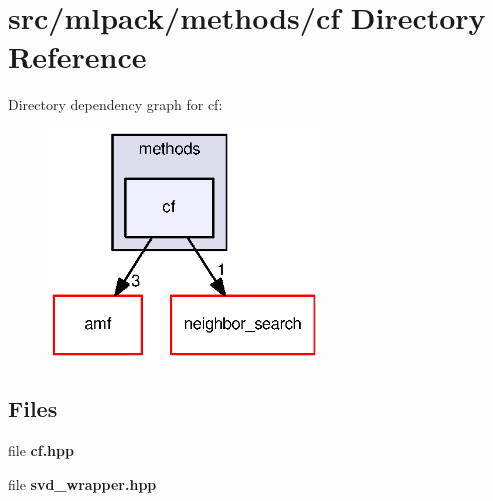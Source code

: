 \section{src/mlpack/methods/cf Directory Reference}
\label{dir_51f04b16a02a56d32fcaa62b5a9b38be}
Directory dependency graph for cf\+:
\nopagebreak
\begin{figure}[H]
\begin{center}
\leavevmode
\includegraphics[width=204pt]{dir_51f04b16a02a56d32fcaa62b5a9b38be_dep}
\end{center}
\end{figure}
\subsection*{Files}
\begin{DoxyCompactItemize}
\item 
file {\bf cf.\+hpp}
\item 
file {\bf svd\+\_\+wrapper.\+hpp}
\end{DoxyCompactItemize}
